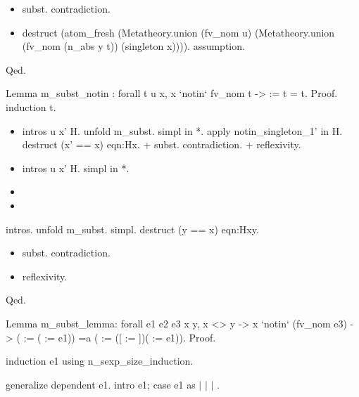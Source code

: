 \begin{itemize}
\item  subst. contradiction.

\item  destruct (atom\_fresh (Metatheory.union (fv\_nom u) (Metatheory.union (fv\_nom (n\_abs y t)) (singleton x)))). assumption.    

\end{itemize}
Qed.  


Lemma m\_subst\_notin : forall t u x, x `notin` fv\_nom t ->  := t = t.
Proof.
  induction t.

\begin{itemize}
\item  intros u x' H. unfold m\_subst. simpl in *. apply notin\_singleton\_1' in H. destruct (x' == x) eqn:Hx.
    + subst. contradiction.
    + reflexivity.

\item  intros u x' H. simpl in *.

\item 

\item 

\end{itemize}


  intros. unfold m\_subst. simpl. destruct (y == x) eqn:Hxy.

\begin{itemize}
\item  subst. contradiction.

\item  reflexivity.

\end{itemize}
Qed.








Lemma m\_subst\_lemma: forall e1 e2 e3 x y, x <> y -> x `notin` (fv\_nom e3) ->
 ( := ( := e1)) =a ( := ([ := ])( := e1)).
Proof.
  

  induction e1 using n\_sexp\_size\_induction.


  

  generalize dependent e1. intro e1; case e1 as  \ensuremath{|}   \ensuremath{|}   \ensuremath{|}   .




